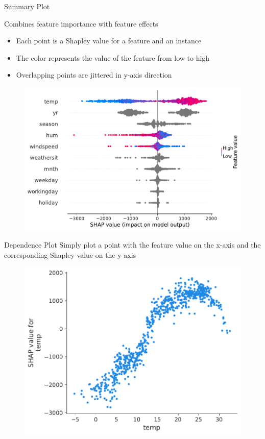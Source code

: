 \documentclass[11pt,compress,t,notes=noshow, aspectratio=169, xcolor=table]{beamer}
\begin{document}
\begin{vbframe}{Summary Plot}

Combines feature importance with feature effects
\begin{itemize}
    \item Each point is a Shapley value for a feature and an instance
    \item The color represents the value of the feature from low to high
    \item Overlapping points are jittered in y-axis direction
\end{itemize}

\begin{figure}
    \centering
    \includegraphics[width=0.5\columnwidth]{slides/shapley/figure_man/global_shap_jitter.pdf}
    
\end{figure}
\end{vbframe} 

\begin{vbframe}{Dependence Plot}
Simply plot a point with the feature value on the x-axis and the corresponding Shapley value on the y-axis

\begin{figure}
    \centering
    \includegraphics[width=0.5\columnwidth]{slides/shapley/figure_man/global_shap_depend.pdf}
\end{figure}

\end{vbframe}
\end{document}
